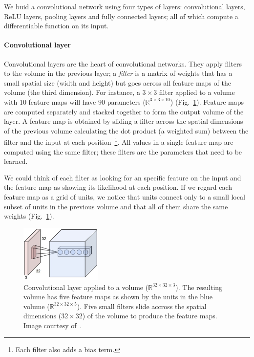 We buid a convolutional network using four types of layers: convolutional layers, ReLU layers, pooling layers and fully connected layers; all of which compute a differentiable function on its input.

\paragraph{Convolutional layer} Convolutional layers are the heart of convolutional networks. They apply filters to the volume in the previous layer; a \emph{filter} is a matrix of weights that has a small spatial size (width and height) but goes across all feature maps of the volume (the third dimension). For instance, a $3\times 3$ filter applied to a volume with 10 feature maps will have 90 parameters ($\mathbb{R}^{3\times3\times10}$) (Fig.~\ref{fig:ConvLayer}).
Feature maps are computed separately and stacked together to form the output volume of the layer. A feature map is obtained by sliding a filter across the spatial dimensions of the previous volume calculating the dot product (a weighted sum) between the filter and the input at each position~\footnote{Each filter also adds a bias term.}.
All values in a single feature map are computed using the same filter; these filters are the parameters that need to be learned.

We could think of each filter as looking for an specific feature on the input and the feature map as showing its likelihood at each position. If we regard each feature map as a grid of units, we notice that units connect only to a small local subset of units in the previous volume and that all of them share the same weights (Fig.~\ref{fig:ConvLayer}).
\begin{figure}[h]
	\centering
	\includegraphics[width = 0.36\textwidth]{plots/convLayer.jpeg}
	\caption[Convolutional layer applied to a volume]{Convolutional layer applied to a volume ($\mathbb{R}^{32\times 32\times 3}$). The resulting volume has five feature maps as shown by the units in the blue volume ($\mathbb{R}^{32\times 32\times 5}$). Five small filters slide accross the spatial dimensions ($32\times 32$) of the volume to produce the feature maps. Image courtesy of~\cite{Karpathy2016}.}
	\label{fig:ConvLayer}
\end{figure}


